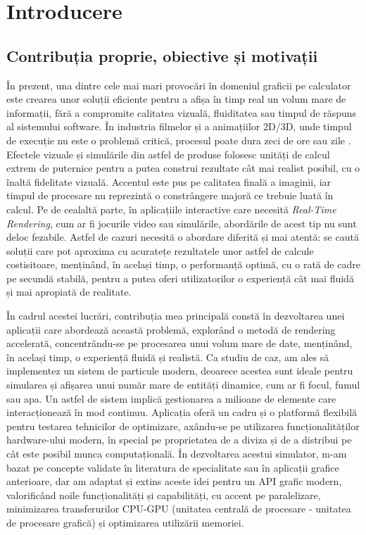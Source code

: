 \chapter{Introducere}

\section{Contribuția proprie, obiective și motivații}
În prezent, una dintre cele mai mari provocări în domeniul graficii pe calculator este crearea unor soluții eficiente pentru a afișa în timp real un volum mare de informații, fără a compromite calitatea vizuală, fluiditatea sau timpul de răspuns al sistemului software. În industria filmelor și a animațiilor 2D/3D, unde timpul de execuție nu este o problemă critică, procesul poate dura zeci de ore sau zile \cite{Pixar-Animation-Rendering_citation}. Efectele vizuale și simulările din astfel de produse folosesc unități de calcul extrem de puternice pentru a putea construi rezultate cât mai realist posibil, cu o înaltă fidelitate vizuală. Accentul este pus pe calitatea finală a imaginii, iar timpul de procesare nu reprezintă o constrângere majoră ce trebuie luată în calcul. Pe de cealaltă parte, în aplicațiile interactive care necesită \textit{Real-Time Rendering}, cum ar fi jocurile video sau simulările, abordările de acest tip nu sunt deloc fezabile. Astfel de cazuri necesită o abordare diferită și mai atentă: se caută soluții care pot aproxima cu acuratețe rezultatele unor astfel de calcule costisitoare, menținând, în același timp, o performanță optimă, cu o rată de cadre pe secundă stabilă, pentru a putea oferi utilizatorilor o experiență cât mai fluidă și mai apropiată de realitate. 

În cadrul acestei lucrări, contribuția mea principală constă în dezvoltarea unei aplicații care abordează această problemă, explorând o metodă de rendering accelerată, concentrându-se pe procesarea unui volum mare de date, menținând, în același timp, o experiență fluidă și realistă. Ca studiu de caz, am ales să implementez un sistem de particule modern, deoarece acestea sunt ideale pentru simularea și afișarea unui număr mare de entități dinamice, cum ar fi focul, fumul sau apa. Un astfel de sistem implică gestionarea a milioane de elemente care interacționează în mod continuu. Aplicația oferă un cadru și o platformă flexibilă pentru testarea tehnicilor de optimizare, axându-se pe utilizarea funcționalităților hardware-ului modern, în special pe proprietatea de a diviza și de a distribui pe cât este posibil munca computațională. În dezvoltarea acestui simulator, m-am bazat pe concepte validate în literatura de specialitate sau în aplicații grafice anterioare, dar am adaptat și extins aceste idei pentru un API grafic modern, valorificând noile funcționalități și capabilități, cu accent pe paralelizare, minimizarea transferurilor CPU-GPU (unitatea centrală de procesare - unitatea de procesare grafică) și optimizarea utilizării memoriei. 

